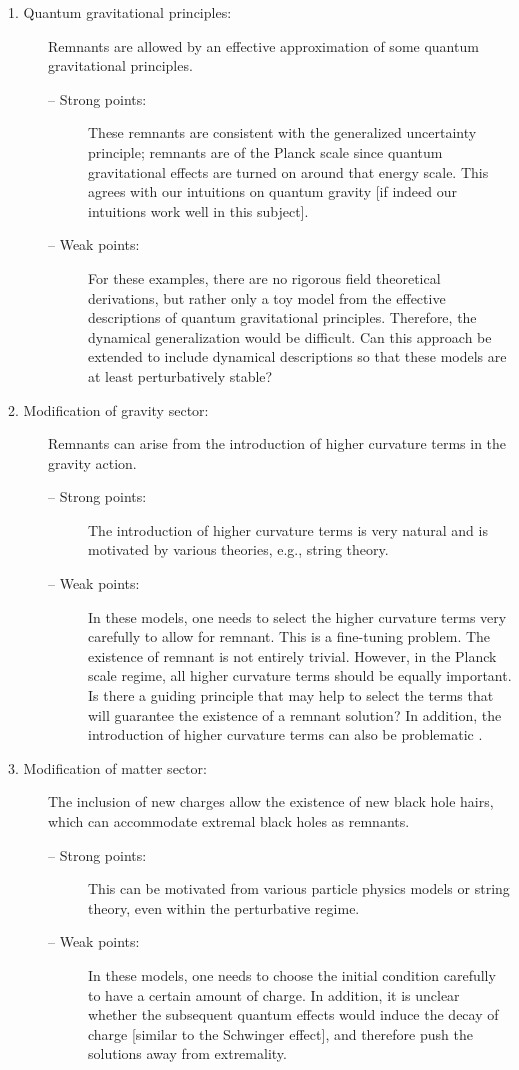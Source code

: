 \documentclass[12pt]{article}
\newcommand{\2}{$^2$}
\newcommand{\3}{$^3$}
\newcommand{\4}{$_4$}
\newcommand{\5}{$_5$}
\begin{document}
\begin{description}
\item[1. Quantum gravitational principles:] Remnants are allowed by an effective approximation of  some quantum gravitational principles.
\begin{description}
\item[-- Strong points:] These remnants are consistent with the generalized uncertainty principle; remnants are of the Planck scale since quantum gravitational effects are turned on around that energy scale. This agrees with our intuitions on quantum gravity [if indeed our intuitions work well in this subject].
\item[-- Weak points:] For these examples, there are no rigorous field theoretical derivations, but rather only a toy model from the effective descriptions of quantum gravitational principles. Therefore, the dynamical generalization would be difficult. Can this approach be extended to include dynamical descriptions so that these models are at least perturbatively stable?
\end{description}
\item[2. Modification of gravity sector:] Remnants can arise from the introduction of higher curvature terms in the gravity action.
\begin{description}
\item[-- Strong points:] The introduction of higher curvature terms is very natural and is motivated by various theories, e.g., string theory.
\item[-- Weak points:] In these models, one needs to select the higher curvature terms very carefully to allow for remnant. This is a fine-tuning problem. The existence of remnant is not entirely trivial. However, in the Planck scale regime, all higher curvature terms should be equally important. Is there a guiding principle that may help to select the terms that will guarantee the existence of a remnant solution? In addition, the introduction of higher curvature terms can also be problematic \cite{camanho}.
\end{description}
\item[3. Modification of matter sector:] The inclusion of new charges allow the existence of new black hole hairs, which can accommodate extremal black holes as remnants.
\begin{description}
\item[-- Strong points:] This can be motivated from various particle physics models or string theory, even within the perturbative regime.
\item[-- Weak points:] In these models, one needs to choose the initial condition carefully to have a certain amount of charge. In addition, it is unclear whether the subsequent quantum effects would induce the decay of charge [similar to the Schwinger effect], and therefore push the solutions away from extremality.
\end{description}
\end{description}
\end{document}

